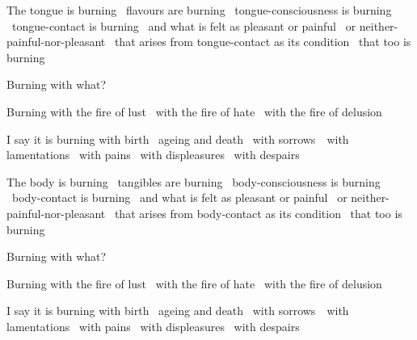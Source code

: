 \begin{english-only-hang}
  The tongue is burning \breathmark\ flavours are burning \breathmark\ tongue-consciousness is burning \breathmark\ tongue-contact is burning \breathmark\ and what is felt as pleasant or painful \breathmark\ or neither-painful-nor-pleasant \breathmark\ that arises from tongue-contact as its condition \breathmark\ that too is burning
\end{english-only-hang}
\begin{english-only-hang-together}
  Burning with what?
\end{english-only-hang-together}
\begin{english-only-hang-together}
  Burning with the fire of lust \breathmark\ with the fire of hate \breathmark\ with the fire of delusion
\end{english-only-hang-together}
\begin{english-only-hang-together}
  I say it is burning with birth \breathmark\ ageing and death \breathmark\ with \mbox{sorrows}~\breathmark\ with lamentations \breathmark\ with pains \breathmark\ with displeasures \breathmark\ with despairs
\end{english-only-hang-together}

\begin{english-only-hang}
  The body is burning \breathmark\ tangibles are burning \breathmark\ body-consciousness is burning \breathmark\ body-contact is burning \breathmark\ and what is felt as pleasant or painful \breathmark\ or neither-painful-nor-pleasant \breathmark\ that arises from body-contact as its condition \breathmark\ that too is burning
\end{english-only-hang}
\begin{english-only-hang-together}
  Burning with what?
\end{english-only-hang-together}
\begin{english-only-hang-together}
  Burning with the fire of lust \breathmark\ with the fire of hate \breathmark\ with the fire of delusion
\end{english-only-hang-together}
\begin{english-only-hang-together}
  I say it is burning with birth \breathmark\ ageing and death \breathmark\ with \mbox{sorrows}~\breathmark\ with lamentations \breathmark\ with pains \breathmark\ with displeasures \breathmark\ with despairs
\end{english-only-hang-together}

\ifbfiveversion\clearpage\fi

